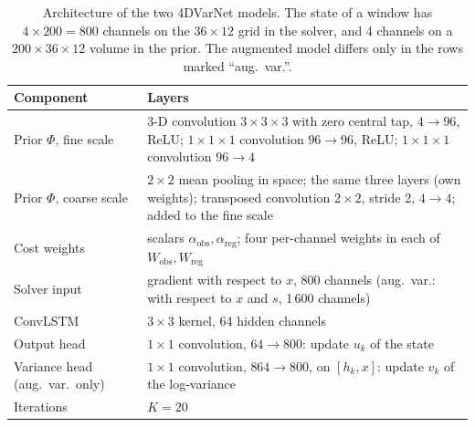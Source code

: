 \documentclass[english, 12pt, a4paper, elec, utf8, a-2b, online]{aaltothesis}
\begin{document}
\begin{table}[htb]
	\centering
	\caption{Architecture of the two 4DVarNet models. The state of a window has
	$4 \times 200 = 800$ channels on the $36 \times 12$ grid in the solver, and 4
	channels on a $200 \times 36 \times 12$ volume in the prior. The augmented
	model differs only in the rows marked ``aug.\ var.''.}
	\label{tab:arch_varnet}
	\small
	\begin{tabular}{L{0.2\textwidth}L{0.73\textwidth}}
		\hline
		Component & Layers \\
		\hline
		Prior $\Phi$, fine scale & 3-D convolution $3 \times 3 \times 3$ with zero central tap, $4 \to 96$, ReLU; $1 \times 1 \times 1$ convolution $96 \to 96$, ReLU; $1 \times 1 \times 1$ convolution $96 \to 4$ \\
		Prior $\Phi$, coarse scale & $2 \times 2$ mean pooling in space; the same three layers (own weights); transposed convolution $2 \times 2$, stride 2, $4 \to 4$; added to the fine scale \\
		Cost weights & scalars $\alpha_{\mathrm{obs}}, \alpha_{\mathrm{reg}}$; four per-channel weights in each of $W_{\mathrm{obs}}, W_{\mathrm{reg}}$ \\
		Solver input & gradient with respect to $x$, 800 channels (aug.\ var.: with respect to $x$ and $s$, 1\,600 channels) \\
		ConvLSTM & $3 \times 3$ kernel, 64 hidden channels \\
		Output head & $1 \times 1$ convolution, $64 \to 800$: update $u_k$ of the state \\
		Variance head (aug.\ var.\ only) & $1 \times 1$ convolution, $864 \to 800$, on $[h_k, x]$: update $v_k$ of the log-variance \\
		Iterations & $K = 20$ \\
		\hline
	\end{tabular}
\end{table}
\end{document}
